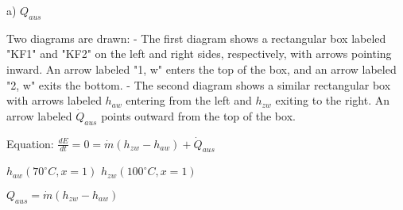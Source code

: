 a) \( Q_{aus} \)  

Two diagrams are drawn:  
- The first diagram shows a rectangular box labeled "KF1" and "KF2" on the left and right sides, respectively, with arrows pointing inward. An arrow labeled "1, w" enters the top of the box, and an arrow labeled "2, w" exits the bottom.  
- The second diagram shows a similar rectangular box with arrows labeled \( h_{aw} \) entering from the left and \( h_{zw} \) exiting to the right. An arrow labeled \( \dot{Q}_{aus} \) points outward from the top of the box.  

Equation:  
\( \frac{dE}{dt} = 0 = \dot{m}(h_{zw} - h_{aw}) + \dot{Q}_{aus} \)  

\( h_{aw}(70^\circ C, x = 1) \)  
\( h_{zw}(100^\circ C, x = 1) \)  

\( Q_{aus} = \dot{m}(h_{zw} - h_{aw}) \)